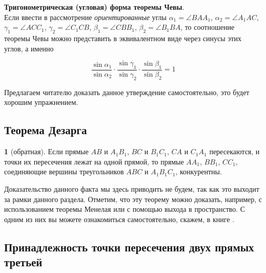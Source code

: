 \documentclass[14pt]{extarticle}
\theoremstyle{definition}
\theoremstyle{theorem}
\newenvironment{namedtheorem}[2]
{
\newcommand{\foo}{#1}
\newtheorem*{\foo{}}{\normalfont\fontsize{15}{15}{Теорема #2}}
\begin{\foo{}}
}
{\end{\foo{}}}
\begin{document}
\noindent \textbf{\small Тригонометрическая (угловая) форма теоремы Чевы}.\\
Если ввести в рассмотрение \textit{ориентированные} углы $\alpha_1 = \angle BAA_1$, 
$\alpha_2 = \angle A_1AC$, $\gamma_1 = \angle ACC_1$, $\gamma_2 = \angle C_1CB$,
$\beta_1 = \angle CBB_1$, $\beta_2 = \angle B_1BA$, то соотношение теоремы
Чевы можно представить в эквивалентном виде через синусы этих углов, а именно


{\setlength{\mathindent}{2.5cm}
\begin{equation*}
\dfrac{\sin \alpha_1}{\sin \alpha_2} \cdot 
	\dfrac{\sin \gamma_1}{\sin \gamma_2} 
\cdot \dfrac{\sin \beta_1}{\sin \beta_2} = 1 
\end{equation*}}
	


Предлагаем читателю доказать данное  утверждение самостоятельно, это 
будет хорошим упражнением.

\subsection{Теорема Дезарга}
\begin{namedtheorem}{dezarg}{Дезарга}[обратная]
Если прямые \(AB\) и \(A_1B_1\), \(BC\) и \(B_1C_1\), \(CA\) и \(C_1A_1\)
пересекаются, и точки их пересечения лежат на одной прямой, то 
прямые \(AA_1\), \(BB_1\), \(CC_1\), соединяющие вершины треугольников 
\(ABC\) и \(A_1B_1C_1\), конкурентны.
\end{namedtheorem}

Доказательство данного факта мы здесь приводить не будем, так как это выходит
за рамки данного раздела. Отметим, что эту теорему можно доказать, например,
с использованием теоремы Менелая или с помощью выхода в пространство.
С одним из них  вы можете ознакомиться самостоятельно, скажем,
в книге .

\subsection{Принадлежность точки пересечения двух прямых третьей}
\end{document}
